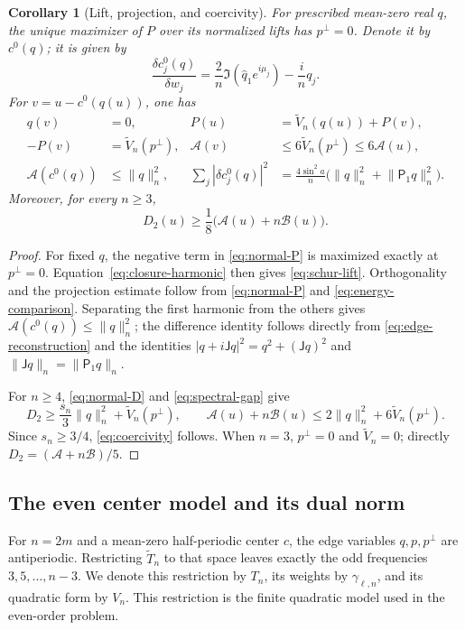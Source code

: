 \documentclass[11pt,reqno]{amsart}
\numberwithin{equation}{section}
\newtheorem{corollary}[theorem]{Corollary}
\theoremstyle{definition}
\theoremstyle{remark}
\newcommand{\A}{\mathcal A}
\newcommand{\B}{\mathcal B}
\newcommand{\norm}[1]{\lVert #1\rVert}
\newcommand{\dd}{\delta}
\begin{document}
\begin{corollary}[Lift, projection, and coercivity]\label{cor:schur}
For prescribed mean-zero real $q$, the unique maximizer of $P$ over its normalized lifts has $p^\perp=0$. Denote it by $c^0(q)$; it is given by
\begin{equation}\label{eq:schur-lift}
 \frac{\dd c_j^0(q)}{\dd w_j}
 =\frac2n\Im(\widehat q_1e^{i\mu_j})-\frac{i}{n}q_j.
\end{equation}
For $v=u-c^0(q(u))$, one has
\begin{align}
 q(v)&=0,&P(u)&=\widetilde V_n(q(u))+P(v),\label{eq:schur-orthogonal}\\
 -P(v)&=\widetilde V_n(p^\perp),&
 \A(v)&\le6\widetilde V_n(p^\perp)\le6\A(u),\label{eq:projection-bound}\\
 \A(c^0(q))&\le\norm{q}_n^2,&
 \sum_j|\dd c_j^0(q)|^2
 &=\frac{4\sin^2a}{n}\bigl(\norm{q}_n^2+\norm{\mathsf P_1q}_n^2\bigr).
 \label{eq:lift-bounds}
\end{align}
Moreover, for every $n\ge3$,
\begin{equation}\label{eq:coercivity}
 D_2(u)\ge\frac18\bigl(\A(u)+n\B(u)\bigr).
\end{equation}
\end{corollary}
\begin{proof}
For fixed $q$, the negative term in \eqref{eq:normal-P} is maximized exactly at $p^\perp=0$. Equation~\eqref{eq:closure-harmonic} then gives \eqref{eq:schur-lift}. Orthogonality and the projection estimate follow from \eqref{eq:normal-P} and \eqref{eq:energy-comparison}. Separating the first harmonic from the others gives $\A(c^0(q))\le\norm q_n^2$; the difference identity follows directly from \eqref{eq:edge-reconstruction} and the identities $|q+i\mathsf Jq|^2=q^2+(\mathsf Jq)^2$ and $\norm{\mathsf Jq}_n=\norm{\mathsf P_1q}_n$.

For $n\ge4$, \eqref{eq:normal-D} and \eqref{eq:spectral-gap} give
\[
 D_2\ge\frac{s_n}{3}\norm q_n^2+\widetilde V_n(p^\perp),
 \qquad \A(u)+n\B(u)\le2\norm q_n^2+6\widetilde V_n(p^\perp).
\]
Since $s_n\ge3/4$, \eqref{eq:coercivity} follows. When $n=3$, $p^\perp=0$ and $\widetilde V_n=0$; directly $D_2=(\A+n\B)/5$.
\end{proof}

\subsection{The even center model and its dual norm}
For $n=2m$ and a mean-zero half-periodic center $c$, the edge variables $q,p,p^\perp$ are antiperiodic. Restricting $\widetilde T_n$ to that space leaves exactly the odd frequencies $3,5,\ldots,n-3$. We denote this restriction by $T_n$, its weights by $\gamma_{\ell,n}$, and its quadratic form by $V_n$. This restriction is the finite quadratic model used in the even-order problem.
\end{document}
